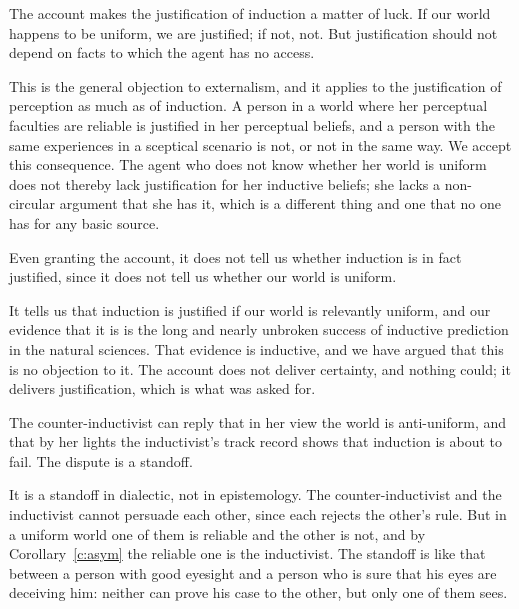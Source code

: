 \documentclass{situationist-preprint}
\begin{document}
\begin{objection}
The account makes the justification of induction a matter of luck. If our world happens to be uniform, we are justified; if not, not. But justification should not depend on facts to which the agent has no access.
\end{objection}

\begin{reply}
This is the general objection to externalism, and it applies to the justification of perception as much as of induction. A person in a world where her perceptual faculties are reliable is justified in her perceptual beliefs, and a person with the same experiences in a sceptical scenario is not, or not in the same way. We accept this consequence. The agent who does not know whether her world is uniform does not thereby lack justification for her inductive beliefs; she lacks a non-circular argument that she has it, which is a different thing and one that no one has for any basic source.
\end{reply}

\begin{objection}
Even granting the account, it does not tell us whether induction is in fact justified, since it does not tell us whether our world is uniform.
\end{objection}

\begin{reply}
It tells us that induction is justified if our world is relevantly uniform, and our evidence that it is is the long and nearly unbroken success of inductive prediction in the natural sciences. That evidence is inductive, and we have argued that this is no objection to it. The account does not deliver certainty, and nothing could; it delivers justification, which is what was asked for.
\end{reply}

\begin{objection}
The counter-inductivist can reply that in her view the world is anti-uniform, and that by her lights the inductivist's track record shows that induction is about to fail. The dispute is a standoff.
\end{objection}

\begin{reply}
It is a standoff in dialectic, not in epistemology. The counter-inductivist and the inductivist cannot persuade each other, since each rejects the other's rule. But in a uniform world one of them is reliable and the other is not, and by Corollary~\ref{c:asym} the reliable one is the inductivist. The standoff is like that between a person with good eyesight and a person who is sure that his eyes are deceiving him: neither can prove his case to the other, but only one of them sees.
\end{reply}
\end{document}
